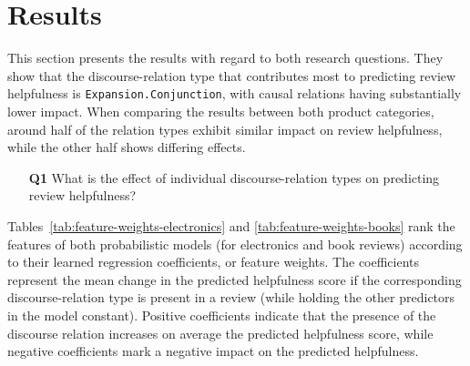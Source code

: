 \documentclass[
    a4paper,%
    12pt,%
    oneside,%
    toc=bibliography,
    final,
]{scrartcl}
\begin{document}
\section{Results}
\label{sec:results}

This section presents the results with regard to both research questions. They show that the discourse-relation type that contributes most to predicting review helpfulness is \lstinline|Expansion.Conjunction|, with causal relations having substantially lower impact. When comparing the results between both product categories, around half of the relation types exhibit similar impact on review helpfulness, while the other half shows differing effects.

\begin{enumerate}[rightmargin=1cm]
\item[\textbf{Q1}] What is the effect of individual discourse-relation types on predicting review helpfulness?
\end{enumerate}

Tables~\ref{tab:feature-weights-electronics} and \ref{tab:feature-weights-books} rank the features of both probabilistic models (for electronics and book reviews) according to their learned regression coefficients, or feature weights.
The coefficients represent the mean change in the predicted helpfulness score if the corresponding discourse-relation type is present in a review (while holding the other predictors in the model constant). Positive coefficients indicate that the presence of the discourse relation increases on average the predicted helpfulness score, while negative coefficients mark a negative impact on the predicted helpfulness.
\end{document}
